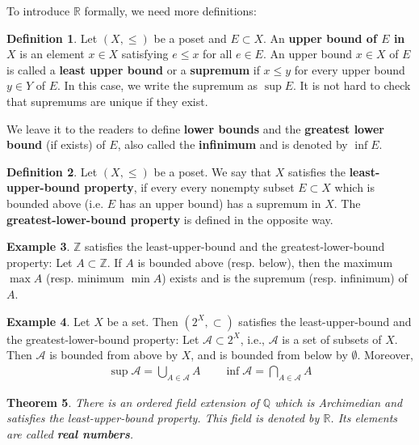 \documentclass[12pt,b5paper,notitlepage]{article}
\theoremstyle{definition}
\newtheorem{df}{Definition}[section]
\newtheorem{eg}[df]{Example}
\theoremstyle{plain}
\newtheorem{thm}[df]{Theorem}
\newcommand{\scr}{\mathscr}
\newcommand{\Zbb}{\mathbb Z}
\newcommand{\Qbb}{\mathbb Q}
\newcommand{\Rbb}{\mathbb R}
\numberwithin{equation}{section}
\begin{document}
To introduce $\Rbb$ formally, we need more definitions:

\begin{df}
Let $(X,\leq)$ be a poset and $E\subset X$. An \textbf{upper bound of $E$ in $X$}  is an element $x\in X$ satisfying $e\leq x$ for all $e\in E$. An upper bound $x\in X$ of $E$ is called a \textbf{least upper bound} or a \textbf{supremum}   if $x\leq y$ for every upper bound $y\in Y$ of $E$. In this case, we write the supremum as  $\sup E$. It is not hard to check that supremums are unique if they exist.

We leave it to the readers to define \textbf{lower bounds} and the \textbf{greatest lower bound} (if exists) of $E$, also called the \textbf{infinimum}  and is denoted by  $\inf E$. \hfill\qedsymbol
\end{df}


\begin{df}
Let $(X,\leq)$ be a poset. We say that $X$ satisfies the \textbf{least-upper-bound property}, if every every nonempty subset $E\subset X$ which is bounded above (i.e. $E$ has an upper bound) has a supremum in $X$. The \textbf{greatest-lower-bound property} is defined in the opposite way.
\end{df}

\begin{eg}
$\Zbb$ satisfies the least-upper-bound and the greatest-lower-bound property: Let $A\subset \Zbb$. If $A$ is bounded above (resp. below), then the maximum $\max A$ (resp. minimum $\min A$) exists and is the supremum (resp. infinimum) of $A$.
\end{eg}

\begin{eg}
Let $X$ be a set. Then $(2^X,\subset)$ satisfies the least-upper-bound and the greatest-lower-bound property: Let $\scr A\subset 2^X$, i.e., $\scr A$ is a set of subsets of $X$. Then $\scr A$ is bounded from above by $X$, and is bounded from below by $\emptyset$. Moreover,
\begin{align*}
\sup\scr A=\bigcup_{A\in\scr A}A\qquad \inf\scr A=\bigcap_{A\in\scr A}A
\end{align*}
\end{eg}





\begin{thm}\label{lb3}
There is an ordered field extension of $\Qbb$ which is Archimedian and satisfies the least-upper-bound property. This field is denoted by  $\Rbb$. Its elements are called  \textbf{real numbers}.
\end{thm}
\end{document}

